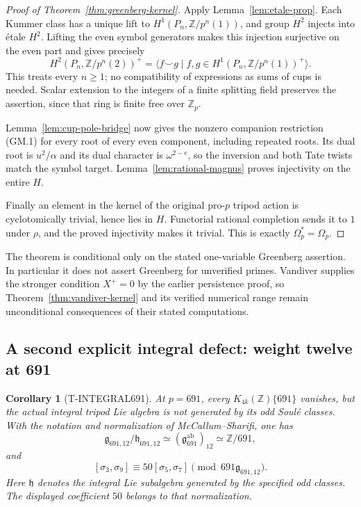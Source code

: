 \documentclass[11pt,a4paper]{article}
\newtheorem{corollary}[theorem]{Corollary}
\theoremstyle{definition}
\begin{document}
\begin{proof}[Proof of Theorem~\ref{thm:greenberg-kernel}]
Apply Lemma~\ref{lem:etale-prop}. Each Kummer class has a unique
lift to $H^1(P_n,\mathbb Z/p^n(1))$, and group $H^2$ injects into
\'etale $H^2$. Lifting the even symbol generators makes this
injection surjective on the even part and gives precisely
\[
 H^2(P_n,\mathbb Z/p^n(2))^+
  =\bigl\langle f\smile g\mid
       f,g\in H^1(P_n,\mathbb Z/p^n(1))^+\bigr\rangle.       \tag{GM.10}
\]
This treats every $n\ge1$; no compatibility of expressions as sums
of cups is needed. Scalar extension to the integers of a finite
splitting field preserves the assertion, since that ring is finite
free over $\mathbb Z_p$.

Lemma~\ref{lem:cup-pole-bridge} now gives the nonzero companion
restriction (GM.1) for every root of every even component, including
repeated roots. Its dual root is $u^2/\alpha$ and its dual character
is $\omega^{2-e}$, so the inversion and both Tate twists match
the symbol target. Lemma~\ref{lem:rational-magnus} proves
injectivity on the entire $H$.

Finally an element in the kernel of the original pro-$p$ tripod
action is cyclotomically trivial, hence lies in $H$. Functorial
rational completion sends it to $1$ under $\rho$, and the proved
injectivity makes it trivial. This is exactly
$\Omega_p^*=\Omega_p$.
\end{proof}

The theorem is conditional only on the stated one-variable
Greenberg assertion. In particular it does not assert Greenberg
for unverified primes. Vandiver supplies the stronger condition
$X^+=0$ by the earlier persistence proof, so
Theorem~\ref{thm:vandiver-kernel} and its verified numerical range
remain unconditional consequences of their stated computations.

\subsection{A second explicit integral defect: weight twelve at 691}

\begin{corollary}[T-INTEGRAL691]
At $p=691$, every $K_{4k}(\mathbb Z)\{691\}$ vanishes, but the
actual integral tripod Lie algebra is not generated by its odd
Soul\'e classes. With the notation and normalization of
McCallum--Sharifi, one has
\[
 \mathfrak g_{691,12}/\mathfrak h_{691,12}
 \simeq (\mathfrak g_{691}^{\mathrm{ab}})_{12}
 \simeq\mathbb Z/691,
\]
and
\[
 [\sigma_3,\sigma_9]\equiv50[\sigma_5,\sigma_7]
       \pmod{691\mathfrak g_{691,12}}.
\]
Here $\mathfrak h$ denotes the integral Lie subalgebra generated by
the specified odd classes. The displayed coefficient $50$ belongs
to that normalization.
\end{corollary}
\end{document}
